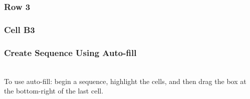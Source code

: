 \documentclass[color=usenames,dvipsnames]{beamer}\usepackage[]{graphicx}\usepackage[]{color}
\begin{document}
\begin{frame}
  \frametitle{Row 3}
\end{frame}



\begin{frame}
  \frametitle{Cell B3}
\end{frame}



\begin{frame}
  \frametitle{Create Sequence Using Auto-fill}
   \\
  \centering
  To use auto-fill: begin a sequence, highlight the cells, and then
  drag the box at the bottom-right of the last cell. \\
\end{frame}
\end{document}
